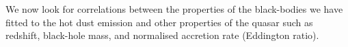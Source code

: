 We now look for correlations between the properties of the black-bodies we have fitted to the hot dust emission and other properties of the quasar such as redshift, black-hole mass, and normalised accretion rate (Eddington ratio). 





